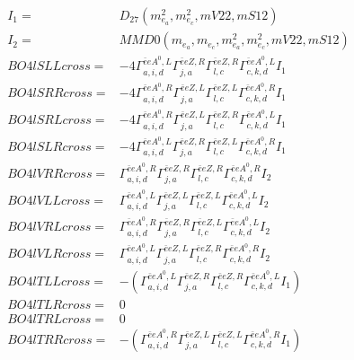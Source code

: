 \documentclass[A4,landscape]{article}
\begin{document}
\begin{align} 
I_1 = & D_{27}(m^2_{e_{{a}}}, m^2_{e_{{c}}}, mV22, mS12) \\ 
I_2 = & MMD0(m_{e_{{a}}}, m_{e_{{c}}}, m^2_{e_{{a}}}, m^2_{e_{{c}}}, mV22, mS12) \\ 
  BO4lSLLcross= & -4  \Gamma^{\bar{e}e A^0 ,L}_{a, i, d} \Gamma^{\bar{e}e Z ,R}_{j, a} \Gamma^{\bar{e}e Z ,R}_{l, c} \Gamma^{\bar{e}e A^0 ,L}_{c, k, d} I_1 \\ 
  BO4lSRRcross= & -4  \Gamma^{\bar{e}e A^0 ,R}_{a, i, d} \Gamma^{\bar{e}e Z ,L}_{j, a} \Gamma^{\bar{e}e Z ,L}_{l, c} \Gamma^{\bar{e}e A^0 ,R}_{c, k, d} I_1 \\ 
  BO4lSRLcross= & -4  \Gamma^{\bar{e}e A^0 ,R}_{a, i, d} \Gamma^{\bar{e}e Z ,L}_{j, a} \Gamma^{\bar{e}e Z ,R}_{l, c} \Gamma^{\bar{e}e A^0 ,L}_{c, k, d} I_1 \\ 
  BO4lSLRcross= & -4  \Gamma^{\bar{e}e A^0 ,L}_{a, i, d} \Gamma^{\bar{e}e Z ,R}_{j, a} \Gamma^{\bar{e}e Z ,L}_{l, c} \Gamma^{\bar{e}e A^0 ,R}_{c, k, d} I_1 \\ 
  BO4lVRRcross= &  \Gamma^{\bar{e}e A^0 ,R}_{a, i, d} \Gamma^{\bar{e}e Z ,R}_{j, a} \Gamma^{\bar{e}e Z ,R}_{l, c} \Gamma^{\bar{e}e A^0 ,R}_{c, k, d} I_2 \\ 
  BO4lVLLcross= &  \Gamma^{\bar{e}e A^0 ,L}_{a, i, d} \Gamma^{\bar{e}e Z ,L}_{j, a} \Gamma^{\bar{e}e Z ,L}_{l, c} \Gamma^{\bar{e}e A^0 ,L}_{c, k, d} I_2 \\ 
  BO4lVRLcross= &  \Gamma^{\bar{e}e A^0 ,R}_{a, i, d} \Gamma^{\bar{e}e Z ,R}_{j, a} \Gamma^{\bar{e}e Z ,L}_{l, c} \Gamma^{\bar{e}e A^0 ,L}_{c, k, d} I_2 \\ 
  BO4lVLRcross= &  \Gamma^{\bar{e}e A^0 ,L}_{a, i, d} \Gamma^{\bar{e}e Z ,L}_{j, a} \Gamma^{\bar{e}e Z ,R}_{l, c} \Gamma^{\bar{e}e A^0 ,R}_{c, k, d} I_2 \\ 
  BO4lTLLcross= & -( \Gamma^{\bar{e}e A^0 ,L}_{a, i, d} \Gamma^{\bar{e}e Z ,R}_{j, a} \Gamma^{\bar{e}e Z ,R}_{l, c} \Gamma^{\bar{e}e A^0 ,L}_{c, k, d} I_1) \\ 
  BO4lTLRcross= & 0 \\ 
  BO4lTRLcross= & 0 \\ 
  BO4lTRRcross= & -( \Gamma^{\bar{e}e A^0 ,R}_{a, i, d} \Gamma^{\bar{e}e Z ,L}_{j, a} \Gamma^{\bar{e}e Z ,L}_{l, c} \Gamma^{\bar{e}e A^0 ,R}_{c, k, d} I_1) \\ 
\end{align} 
\end{document}

